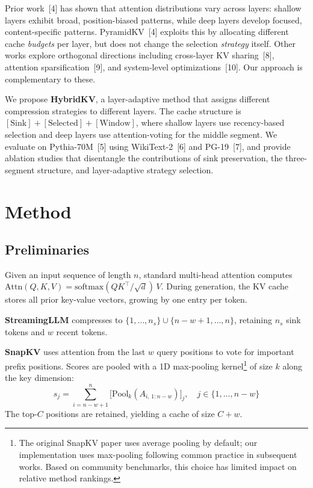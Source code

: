 \documentclass{article}
\begin{document}
Prior work~[4] has shown that attention distributions vary across layers: shallow layers exhibit broad, position-biased patterns, while deep layers develop focused, content-specific patterns. PyramidKV~[4] exploits this by allocating different cache \emph{budgets} per layer, but does not change the selection \emph{strategy} itself. Other works explore orthogonal directions including cross-layer KV sharing~[8], attention sparsification~[9], and system-level optimizations~[10]. Our approach is complementary to these.

We propose \textbf{HybridKV}, a layer-adaptive method that assigns different compression strategies to different layers. The cache structure is $[\text{Sink}] + [\text{Selected}] + [\text{Window}]$, where shallow layers use recency-based selection and deep layers use attention-voting for the middle segment. We evaluate on Pythia-70M~[5] using WikiText-2~[6] and PG-19~[7], and provide ablation studies that disentangle the contributions of sink preservation, the three-segment structure, and layer-adaptive strategy selection.

\section{Method}

\subsection{Preliminaries}

Given an input sequence of length $n$, standard multi-head attention computes $\text{Attn}(Q, K, V) = \text{softmax}(QK^\top / \sqrt{d})\, V$. During generation, the KV cache stores all prior key-value vectors, growing by one entry per token.

\textbf{StreamingLLM} compresses to $\{1, \ldots, n_s\} \cup \{n\!-\!w\!+\!1, \ldots, n\}$, retaining $n_s$ sink tokens and $w$ recent tokens.

\textbf{SnapKV} uses attention from the last $w$ query positions to vote for important prefix positions. Scores are pooled with a 1D max-pooling kernel\footnote{The original SnapKV paper uses average pooling by default; our implementation uses max-pooling following common practice in subsequent works. Based on community benchmarks, this choice has limited impact on relative method rankings.} of size $k$ along the key dimension:
\begin{equation}
    s_j = \sum_{i=n-w+1}^{n} \bigl[\text{Pool}_{k}(A_{i,\,1:n-w})\bigr]_j, \quad j \in \{1, \ldots, n\!-\!w\}
\end{equation}
The top-$C$ positions are retained, yielding a cache of size $C + w$.
\end{document}
